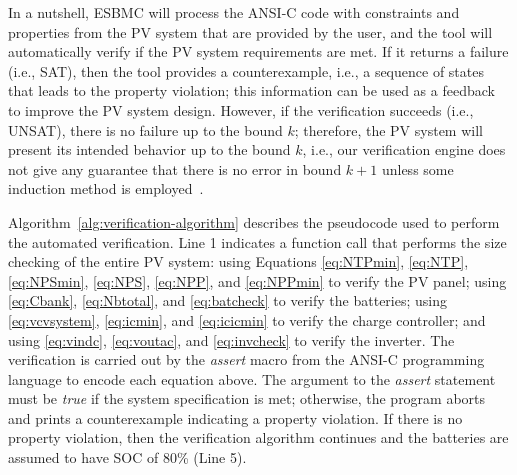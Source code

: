\documentclass[journal]{IEEEtran}
\begin{document}
%
In a nutshell, ESBMC will process the ANSI-C code with constraints %
and properties %
from the PV system that are provided by the user, and the tool will automatically verify if the PV system requirements are met. If it returns a failure (i.e., SAT), then the tool provides a counterexample, i.e., a sequence of states that leads to the property violation; this information can be used as a feedback to improve the PV system design. However, if the verification succeeds (i.e., UNSAT), there is no failure up to the bound $k$; therefore, the PV system will present its intended behavior up to the bound $k$, i.e., our verification engine does not give any guarantee that there is no error in bound $k+1$ unless some induction method is employed~\cite{DBLP:journals/sttt/GadelhaIC17}.
%
%
%
% 
%
%
%

Algorithm~\ref{alg:verification-algorithm} describes the pseudocode used to perform the automated verification. Line 1 indicates a function call that performs the size checking of the entire PV system: using Equations \eqref{eq:NTPmin}, \eqref{eq:NTP}, \eqref{eq:NPSmin}, \eqref{eq:NPS}, \eqref{eq:NPP}, and \eqref{eq:NPPmin} to verify the PV panel; using \eqref{eq:Cbank}, \eqref{eq:Nbtotal}, and \eqref{eq:batcheck} to verify the batteries; using \eqref{eq:vcvsystem}, \eqref{eq:icmin}, and \eqref{eq:icicmin} to verify the charge controller; and using \eqref{eq:vindc}, \eqref{eq:voutac}, and \eqref{eq:invcheck} to verify the inverter. The verification is carried out by the \textit{assert} macro from the ANSI-C programming language to encode each equation above. The argument to the \textit{assert} statement must be \textit{true} if the system specification is met; otherwise, the program aborts and prints a counterexample indicating a property violation. If there is no property violation, then the verification algorithm continues and the batteries are assumed to have SOC of 80\% (Line 5).
\end{document}
